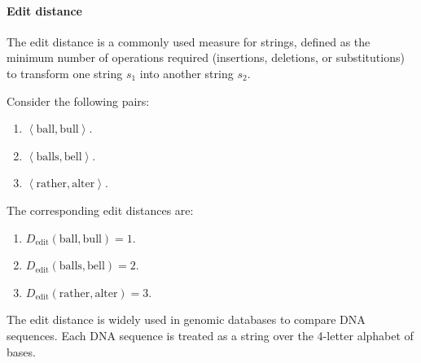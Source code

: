 \paragraph*{Edit distance}
The edit distance is a commonly used measure for strings, defined as the minimum number of operations required (insertions, deletions, or substitutions) to transform one string $s_1$ into another string $s_2$. 
\begin{example}
    Consider the following pairs: 
    \begin{enumerate}
        \item $\left\langle \text{ball},\text{bull} \right\rangle$.
        \item $\left\langle \text{balls},\text{bell} \right\rangle$.
        \item $\left\langle \text{rather},\text{alter} \right\rangle$.
    \end{enumerate}
    The corresponding edit distances are: 
    \begin{enumerate}
        \item $D_{\text{edit}}(\text{ball},\text{bull})=1$.
        \item $D_{\text{edit}}(\text{balls},\text{bell})=2$.
        \item $D_{\text{edit}}(\text{rather},\text{alter})=3$.
    \end{enumerate}
\end{example}
The edit distance is widely used in genomic databases to compare DNA sequences. 
Each DNA sequence is treated as a string over the 4-letter alphabet of bases.
